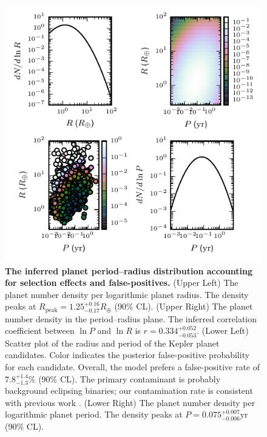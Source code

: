 \documentclass[apjl]{emulateapj}
\newcommand{\Rpeak}{R_\mathrm{peak}}
\newcommand{\REarth}{R_\oplus}
\newcommand{\rpeakrange}{1.25_{-0.17}^{+0.16}}
\newcommand{\corrcoeffrange}{0.334_{-0.053}^{+0.052}}
\newcommand{\fposrange}{7.8_{-1.3}^{+1.4}\%}
\newcommand{\ppeakrange}{0.075_{-0.006}^{+0.007}}
\begin{document}
\begin{figure}
  \includegraphics[width=\columnwidth]{foreground-dist}
  \caption{\label{fig:foreground-dist} \textbf{The inferred planet
      period--radius distribution accounting for selection effects and
      false-positives.}  (Upper Left) The planet number density per
    logarithmic planet radius.  The density peaks at $\Rpeak =
    \rpeakrange \REarth$ (90\% CL).  (Upper Right) The planet number
    density in the period--radius plane.  The inferred correlation
    coefficient between $\ln P$ and $\ln R$ is $r = \corrcoeffrange$.
    (Lower Left) Scatter plot of the radius and period of the Kepler
    planet candidates.  Color indicates the posterior false-positive
    probability for each candidate.  Overall, the model prefers a
    false-positive rate of $\fposrange$ (90\% CL).  The primary
    contaminant is probably background eclipsing binaries; our
    contamination rate is consistent with previous work
    \citep{Morton2011,Fressin2013}. (Lower Right) The planet number
    density per logarithmic planet period.  The density peaks at $P =
    \ppeakrange \mathrm{yr}$ (90\% CL). }
\end{figure}
\end{document}
